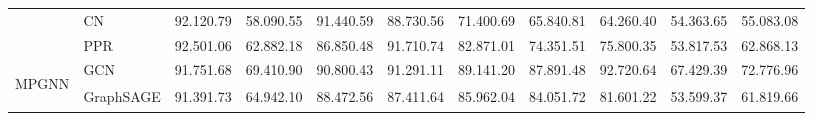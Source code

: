 \documentclass[sigconf, nonacm]{acmart}
\begin{document}
\begin{table*}[t]
{\begin{tabular}{p{12pt}|l|llll|lllll}
            & CN                     & 92.12{\scriptsize0.79}                                     & 58.09{\scriptsize0.55}                                     & 91.44{\scriptsize0.59}                                     & 88.73{\scriptsize0.56}                                     & 71.40{\scriptsize0.69}                                     & 65.84{\scriptsize0.81}                                     & 64.26{\scriptsize0.40}                                     & 54.36{\scriptsize3.65}                                     & 55.08{\scriptsize3.08}                                      \\
    & PPR                    & 92.50{\scriptsize1.06}                                     & 62.88{\scriptsize2.18}                                     & 86.85{\scriptsize0.48}                                     & 91.71{\scriptsize0.74}                                     & 82.87{\scriptsize1.01}                                     & 74.35{\scriptsize1.51}                                     & 75.80{\scriptsize0.35}                                     & 53.81{\scriptsize7.53}                                     & 62.86{\scriptsize8.13}                                      \\ 
\hline
\multirow{3}{*}{{\begin{sideways}MPGNN\end{sideways}}}                                               & GCN                    & 91.75{\scriptsize1.68}                                     & 69.41{\scriptsize0.90}                                     & 90.80{\scriptsize0.43}                                     & 91.29{\scriptsize1.11}                                     & 89.14{\scriptsize1.20}                                     & 87.89{\scriptsize1.48}                                     & 92.72{\scriptsize0.64}                                     & 67.42{\scriptsize9.39}                                     & 72.77{\scriptsize6.96}                                      \\
            & GraphSAGE              & 91.39{\scriptsize1.73}                                     & 64.94{\scriptsize2.10}                                     & 88.47{\scriptsize2.56}                                     & 87.41{\scriptsize1.64}                                     & 85.96{\scriptsize2.04}                                     & 84.05{\scriptsize1.72}                                     & 81.60{\scriptsize1.22}                                     & 53.59{\scriptsize9.37}                                     & 61.81{\scriptsize9.66}                                      \\

\end{tabular}}
\end{table*}
\end{document}
